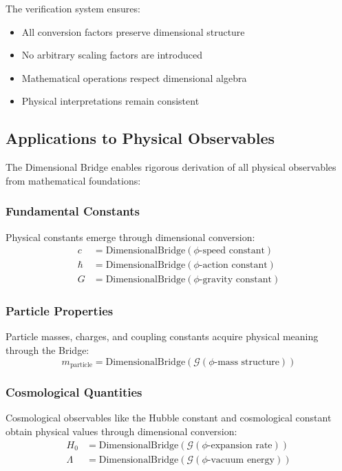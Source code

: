 The verification system ensures:
\begin{itemize}
\item All conversion factors preserve dimensional structure
\item No arbitrary scaling factors are introduced
\item Mathematical operations respect dimensional algebra
\item Physical interpretations remain consistent
\end{itemize}

\subsection{Applications to Physical Observables}

The Dimensional Bridge enables rigorous derivation of all physical observables from mathematical foundations:

\subsubsection{Fundamental Constants}
Physical constants emerge through dimensional conversion:
\begin{align}
c &= \text{DimensionalBridge}(\text{$\phi$-speed constant}) \\
\hbar &= \text{DimensionalBridge}(\text{$\phi$-action constant}) \\
G &= \text{DimensionalBridge}(\text{$\phi$-gravity constant})
\end{align}

\subsubsection{Particle Properties}
Particle masses, charges, and coupling constants acquire physical meaning through the Bridge:
\begin{equation}
m_{\text{particle}} = \text{DimensionalBridge}(\mathcal{G}(\text{$\phi$-mass structure}))
\end{equation}

\subsubsection{Cosmological Quantities}
Cosmological observables like the Hubble constant and cosmological constant obtain physical values through dimensional conversion:
\begin{align}
H_0 &= \text{DimensionalBridge}(\mathcal{G}(\text{$\phi$-expansion rate})) \\
\Lambda &= \text{DimensionalBridge}(\mathcal{G}(\text{$\phi$-vacuum energy}))
\end{align}

